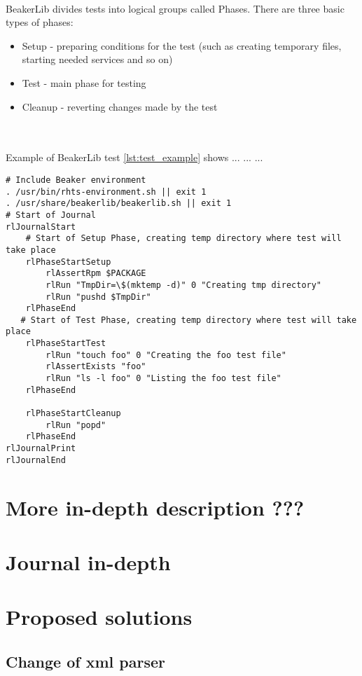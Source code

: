 ~\\
BeakerLib divides tests into logical groups called Phases. There are three basic types of phases:
\begin{itemize}
\item Setup - preparing conditions for the test (such as creating temporary files, starting needed services and so on)
\item Test - main phase for testing
\item Cleanup - reverting changes made by the test
\end{itemize}
~\\
\\
Example of BeakerLib test \ref{lst:test_example} shows ... ... ...

\begin{lstlisting}[style=beakerlib_bash,caption={BeakerLib basic test example},label={lst:test_example}]
# Include Beaker environment
. /usr/bin/rhts-environment.sh || exit 1
. /usr/share/beakerlib/beakerlib.sh || exit 1
# Start of Journal
rlJournalStart
    # Start of Setup Phase, creating temp directory where test will take place 
    rlPhaseStartSetup
        rlAssertRpm $PACKAGE
        rlRun "TmpDir=\$(mktemp -d)" 0 "Creating tmp directory"
        rlRun "pushd $TmpDir"
    rlPhaseEnd
   # Start of Test Phase, creating temp directory where test will take place
    rlPhaseStartTest
        rlRun "touch foo" 0 "Creating the foo test file"
        rlAssertExists "foo"
        rlRun "ls -l foo" 0 "Listing the foo test file"
    rlPhaseEnd

    rlPhaseStartCleanup
        rlRun "popd"
    rlPhaseEnd
rlJournalPrint
rlJournalEnd
\end{lstlisting}


\section{More in-depth description ??? }

\section{Journal in-depth}

\section{Proposed solutions}

\subsection{Change of xml parser}


